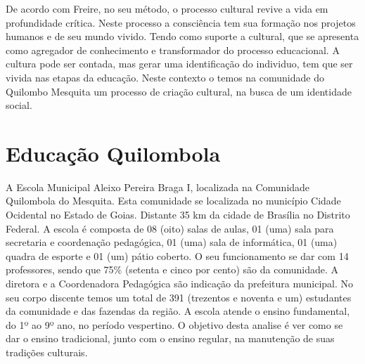\hspace{1.5cm}
De acordo com Freire\cite{freire}, no seu método, o processo cultural revive  a vida em profundidade crítica. Neste processo a consciência tem sua formação nos projetos humanos e de seu mundo vivido. Tendo como suporte a cultural, que se apresenta como agregador de conhecimento e transformador do processo educacional. A cultura pode ser contada, mas gerar uma identificação do individuo, tem que ser vivida nas etapas da educação. Neste contexto o temos na comunidade do Quilombo Mesquita um processo de criação cultural, na busca de um identidade social.

\section*{Educação Quilombola}
\hspace{1.5cm}
A Escola Municipal Aleixo Pereira Braga I, localizada na Comunidade Quilombola do Mesquita. Esta comunidade se localizada no município Cidade Ocidental no Estado de Goias. Distante 35 km da cidade de Brasília no Distrito Federal. A escola é composta de 08 (oito) salas de aulas, 01 (uma) sala para secretaria e coordenação pedagógica, 01 (uma) sala de informática, 01 (uma) quadra de esporte e 01 (um) pátio coberto. O seu funcionamento se dar com 14 professores, sendo que 75\% (setenta e cinco por cento) são da comunidade. A diretora e a Coordenadora Pedagógica são indicação da prefeitura municipal. No seu corpo discente temos um total de 391 (trezentos e noventa e um) estudantes da comunidade e das fazendas da região. A escola atende o ensino fundamental, do 1º ao 9º ano, no período vespertino. O objetivo desta analise é ver como se dar o ensino tradicional, junto com o ensino regular, na manutenção de suas tradições culturais.\\

